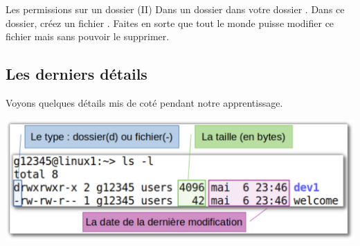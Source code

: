 \documentclass[a4paper,11pt]{style-esi/td}
\begin{document}
		\begin{Exercice}{Les permissions sur un dossier (II)}           
			Dans un dossier  dans votre dossier .
			Dans ce dossier, créez un fichier .
			Faites en sorte que tout le monde puisse modifier ce fichier 
			mais sans pouvoir le supprimer.
		\end{Exercice}

	\subsection{Les derniers détails}

		Voyons quelques détails mis de coté pendant notre apprentissage.

		\begin{center}
			\includegraphics[width=.7\textwidth]{image/reste.pdf}
		\end{center}
\end{document}
